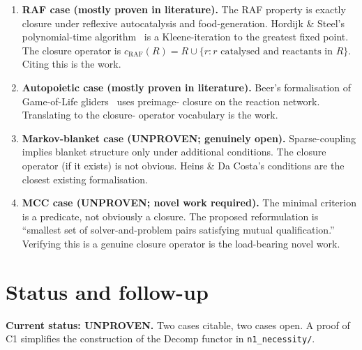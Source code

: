\documentclass[11pt]{article}
\theoremstyle{plain}
\theoremstyle{definition}
\begin{document}
\begin{enumerate}[leftmargin=2em,itemsep=4pt]
  \item \textbf{RAF case (mostly proven in literature).} The RAF
    property is exactly closure under reflexive autocatalysis and
    food-generation. Hordijk \& Steel's polynomial-time
    algorithm~\cite{hordijk2004raf} is a Kleene-iteration to the
    greatest fixed point. The closure operator is
    $c_{\mathrm{RAF}}(R) = R \cup \{r : r \text{ catalysed and reactants in } R\}$.
    Citing this is the work.
  \item \textbf{Autopoietic case (mostly proven in literature).}
    Beer's formalisation of Game-of-Life
    gliders~\cite{beer2014glider,beer2015autopoiesis} uses preimage-
    closure on the reaction network. Translating to the closure-
    operator vocabulary is the work.
  \item \textbf{Markov-blanket case (UNPROVEN; genuinely open).}
    Sparse-coupling implies blanket structure only under additional
    conditions. The closure operator (if it exists) is not obvious.
    Heins \& Da Costa's conditions are the closest existing
    formalisation.
  \item \textbf{MCC case (UNPROVEN; novel work required).} The minimal
    criterion is a predicate, not obviously a closure. The proposed
    reformulation is ``smallest set of solver-and-problem pairs
    satisfying mutual qualification.'' Verifying this is a genuine
    closure operator is the load-bearing novel work.
\end{enumerate}

\section{Status and follow-up}

\textbf{Current status: UNPROVEN.} Two cases citable, two cases open.
A proof of C1 simplifies the construction of the $\mathrm{Decomp}$
functor in \texttt{n1\_necessity/}.



\end{document}
